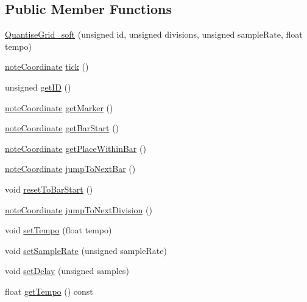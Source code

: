 \subsection*{Public Member Functions}
\begin{DoxyCompactItemize}
\item 
\hyperlink{classQuantiseGrid__soft_ab40cf2cb17e78f06519e2aedd8022f8a}{Quantise\+Grid\+\_\+soft} (unsigned id, unsigned divisions, unsigned sample\+Rate, float tempo)
\item 
\hyperlink{structQuantiseGrid__soft_1_1noteCoordinate}{note\+Coordinate} \hyperlink{classQuantiseGrid__soft_a2af018d83f17638adb6483c85b67435f}{tick} ()
\item 
unsigned \hyperlink{classQuantiseGrid__soft_aa3a80d71734e4a258f226fb8317130fa}{get\+ID} ()
\item 
\hyperlink{structQuantiseGrid__soft_1_1noteCoordinate}{note\+Coordinate} \hyperlink{classQuantiseGrid__soft_af75a096d63f430fb9190d0622b55712f}{get\+Marker} ()
\item 
\hyperlink{structQuantiseGrid__soft_1_1noteCoordinate}{note\+Coordinate} \hyperlink{classQuantiseGrid__soft_ae9ba34054f04e9418b2de0a0ce2b4c05}{get\+Bar\+Start} ()
\item 
\hyperlink{structQuantiseGrid__soft_1_1noteCoordinate}{note\+Coordinate} \hyperlink{classQuantiseGrid__soft_a379f20a256203270ddfbee891558fc4e}{get\+Place\+Within\+Bar} ()
\item 
\hyperlink{structQuantiseGrid__soft_1_1noteCoordinate}{note\+Coordinate} \hyperlink{classQuantiseGrid__soft_a8f24b5579033e3bc267d7c2c7457d213}{jump\+To\+Next\+Bar} ()
\item 
void \hyperlink{classQuantiseGrid__soft_a6eadd70b1a9cfe9bb672402e415c8080}{reset\+To\+Bar\+Start} ()
\item 
\hyperlink{structQuantiseGrid__soft_1_1noteCoordinate}{note\+Coordinate} \hyperlink{classQuantiseGrid__soft_a09658510d81c50f2a61b224e760323ef}{jump\+To\+Next\+Division} ()
\item 
void \hyperlink{classQuantiseGrid__soft_a49a982952228b5b76a99911d0fbcf1ab}{set\+Tempo} (float tempo)
\item 
void \hyperlink{classQuantiseGrid__soft_a6486e5f526e5f89209ef9e1bed122bf8}{set\+Sample\+Rate} (unsigned sample\+Rate)
\item 
void \hyperlink{classQuantiseGrid__soft_a1c7a53e2ddb58a78013b870a5828a712}{set\+Delay} (unsigned samples)
\item 
float \hyperlink{classQuantiseGrid__soft_a5d89260a421c8133fb2b51fd9a161617}{get\+Tempo} () const 

\end{DoxyCompactItemize}
